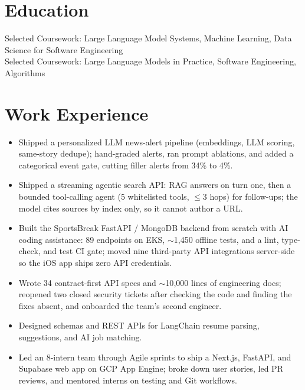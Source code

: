 \documentclass[11pt, letterpaper]{article}
\begin{document}

\section{Education}
Selected Coursework: Large Language Model Systems, Machine Learning, Data Science for Software Engineering\\[1pt]
Selected Coursework: Large Language Models in Practice, Software Engineering, Algorithms

\section{Work Experience}
\begin{itemize}
  \item Shipped a personalized LLM news-alert pipeline (embeddings, LLM scoring, same-story dedupe); hand-graded alerts, ran prompt ablations, and added a categorical event gate, cutting filler alerts from 34\% to 4\%.
  \item Shipped a streaming agentic search API: RAG answers on turn one, then a bounded tool-calling agent (5 whitelisted tools, $\le$3 hops) for follow-ups; the model cites sources by index only, so it cannot author a URL.
  \item Built the SportsBreak FastAPI / MongoDB backend from scratch with AI coding assistance: 89 endpoints on EKS, $\sim$1{,}450 offline tests, and a lint, type-check, and test CI gate; moved nine third-party API integrations server-side so the iOS app ships zero API credentials.
  \item Wrote 34 contract-first API specs and $\sim$10{,}000 lines of engineering docs; reopened two closed security tickets after checking the code and finding the fixes absent, and onboarded the team's second engineer.
\end{itemize}

\vspace{1pt}
\begin{itemize}
  \item Designed schemas and REST APIs for LangChain resume parsing, suggestions, and AI job matching.
  \item Led an 8-intern team through Agile sprints to ship a Next.js, FastAPI, and Supabase web app on GCP App Engine; broke down user stories, led PR reviews, and mentored interns on testing and Git workflows.
\end{itemize}
\end{document}
